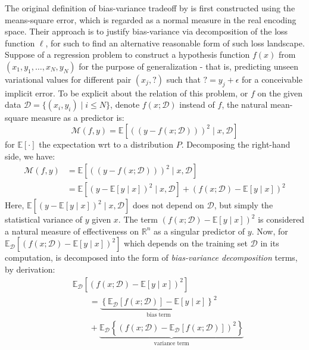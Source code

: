 The original definition of bias-variance tradeoff by \cite{6797087} is first constructed using the means-square error, which is regarded as a normal measure in the real encoding space. Their approach is to justify bias-variance via decomposition of the loss function $\ell$, for such to find an alternative reasonable form of such loss landscape. Suppose of a regression problem to construct a hypothesis function $f(x)$ from $(x_{1},y_{1},\dots,x_{N},y_{N})$ for the purpose of generalization - that is, predicting unseen variational values for different pair $(x_{j}, \mathord{?})$ such that $\mathord{?}=y_{j}+\epsilon$ for a conceivable implicit error. To be explicit about the relation of this problem, or $f$ on the given data $\mathcal{D}=\{(x_i, y_i)\mid i \leq N\}$, denote $f(x;\mathcal{D})$ instead of $f$, the natural mean-square measure as a predictor is: 
\begin{equation}
    \mathcal{M}(f,y) = \mathbb{E} \left[((y-f(x;\mathcal{D})))^{2}\mid x, \mathcal{D}\right] 
\end{equation} for $\mathbb{E}[\cdot]$ the expectation wrt to a distribution $P$. Decomposing the right-hand side, we have: 
\begin{equation}
    \begin{split}
        \mathcal{M}(f,y) &= \mathbb{E} \left[((y-f(x;\mathcal{D})))^{2}\mid x, \mathcal{D}\right] \\
        &= \mathbb{E}\left[(y-\mathbb{E}[y\mid x])^{2}\mid x,\mathcal{D}\right] + (f(x;\mathcal{D})-\mathbb{E}[y\mid x])^{2}
    \end{split}
\end{equation}
Here, $\mathbb{E}\left[(y-\mathbb{E}[y\mid x])^{2}\mid x,\mathcal{D}\right]$ does not depend on $\mathcal{D}$, but simply the statistical variance of $y$ given $x$. The term $(f(x;\mathcal{D})-\mathbb{E}[y\mid x])^{2}$ is considered a natural measure of effectiveness on $\mathbb{R}^{n}$ as a singular predictor of $y$. Now, for $\mathbb{E}_{\mathcal{D}}\left[(f(x;\mathcal{D})-\mathbb{E}[y\mid x])^{2}\right]$ which depends on the training set $\mathcal{D}$ in its computation, is decomposed into the form of \textit{bias-variance decomposition} terms, by derivation: 
\begin{equation}
    \begin{split}
        &\mathbb{E}_{\mathcal{D}} \left[(f(x;\mathcal{D})-\mathbb{E}[y\mid x])^{2}\right] \\
        &\quad \quad = \underbrace{\left\{ \mathbb{E}_{\mathcal{D}}[f(x;\mathcal{D})] - \mathbb{E}[y\mid x] \right\}^{2}}_{\text{bias term}} \\
        &\quad\quad + \underbrace{\mathbb{E}_{\mathcal{D}} \left\{(f(x;\mathcal{D})- \mathbb{E}_{\mathcal{D}}[f(x;\mathcal{D})])^{2}\right\}}_{\text{variance term}}
    \end{split}
\end{equation}

